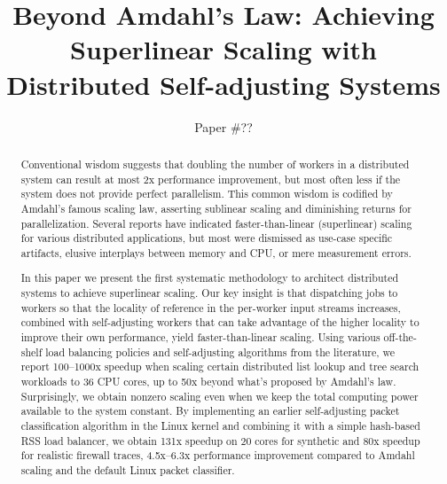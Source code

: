 \documentclass[letterpaper,twocolumn,10pt]{article}
\begin{document}


\title{Beyond Amdahl's Law: Achieving Superlinear Scaling with\\Distributed Self-adjusting Systems}

\author{Paper \#??} %

\maketitle

\begin{abstract}
  Conventional wisdom suggests that doubling the number of workers in a distributed system can result at most 2x performance improvement, but most often less if the system does not provide perfect parallelism.  This common wisdom is codified by Amdahl's famous scaling law, asserting sublinear scaling and diminishing returns for parallelization. Several reports have indicated faster-than-linear (superlinear) scaling for various distributed applications, but most were dismissed as use-case specific artifacts, elusive interplays between memory and CPU, or mere measurement errors.

  In this paper we present the first systematic methodology to architect distributed systems to achieve superlinear scaling. Our key insight is that dispatching jobs to workers so that the locality of reference in the per-worker input streams increases, combined with self-adjusting workers that can take advantage of the higher locality to improve their own performance, yield faster-than-linear scaling. Using various off-the-shelf load balancing policies and self-adjusting algorithms from the literature, we report 100--1000x speedup when scaling certain distributed list lookup and tree search workloads to 36 CPU cores, up to 50x beyond what's proposed by Amdahl's law.  Surprisingly, we obtain nonzero scaling even when we keep the total computing power available to the system constant. By implementing an earlier self-adjusting packet classification algorithm in the Linux kernel and combining it with a simple hash-based RSS load balancer, we obtain 131x speedup on 20 cores for synthetic and 80x speedup for realistic firewall traces, 4.5x--6.3x performance improvement compared to Amdahl scaling and the default Linux packet classifier.
\end{abstract}
\end{document}
